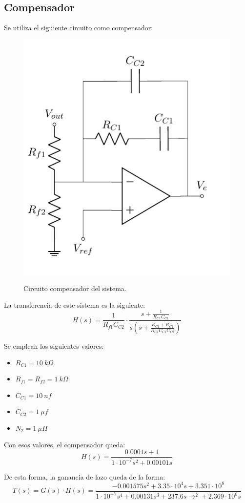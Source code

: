 \subsection{Compensador}

Se utiliza el siguiente circuito como compensador:
\begin{figure}[H]
	\centering
	\includegraphics[width=0.3\linewidth, page = 1]{ImagenesParteIII/CircuitsP3.pdf}
	\label{fig:compensador}
	\caption{Circuito compensador del sistema.}
\end{figure}

La transferencia de este sistema es la siguiente:
\begin{equation}
	H(s) = \frac{ 1 }{ R_{f1} C_{C2} } \cdot \frac{s + \frac{1}{ R_{C1} C_{C1}}}{ s \left( s + \frac{R_{C1} + R_{C2}}{R_{C1} C_{C1} C_{C2}} \right)}
\end{equation}

Se emplean los siguientes valores:
\begin{multicols}{2}
\begin{itemize}
	\item $R_{C1} = 10 \ k\Omega$
	\item $R_{f1} = R_{f2} = 1 \ k\Omega$
	\item $C_{C1} = 10 \ nf$
	\item $C_{C2} = 1 \ \mu f$
	\item $N_2 = 1 \ \mu H$
\end{itemize}
\end{multicols}

Con esos valores, el compensador queda:
\begin{equation}
	H(s) = \frac{0.0001 s + 1}{ 1 \cdot 10^{-7} s^2 + 0.00101 s }
\end{equation}

De esta forma, la ganancia de lazo queda de la forma:
\begin{equation}
	T(s) = G(s) \cdot H(s) = \frac{-0.001575 s^2 + 3.35 \cdot 10^4 s + 3.351 \cdot 10^8}{ 1 \cdot 10^{-7} s^4 + 0.00131 s^3 + 237.6 s→^2 + 2.369 \cdot 10^6 s }
\end{equation}


